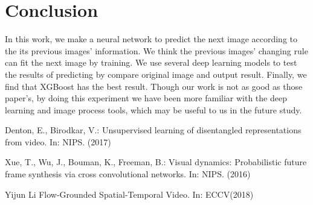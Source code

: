 \documentclass{acmtog} %
\begin{document}
\section{Conclusion}
In this work, we make a neural network to predict the next image according to the its previous images’ information. We think the previous images’ changing rule can fit the next image by training. We use several deep learning models to test the results of predicting by compare original image and output result. Finally, we find that XGBoost has the best result. Though our work is not as good as those paper’s, by doing this experiment we have been more familiar with the deep learning and image process tools, which may be useful to us in the future study.



Denton, E., Birodkar, V.: Unsupervised learning of disentangled representations from video. In: NIPS. (2017)

Xue, T., Wu, J., Bouman, K., Freeman, B.: Visual dynamics: Probabilistic future frame synthesis via cross convolutional networks. In: NIPS. (2016)

Yijun Li Flow-Grounded Spatial-Temporal Video. In: ECCV(2018)
\end{document}
